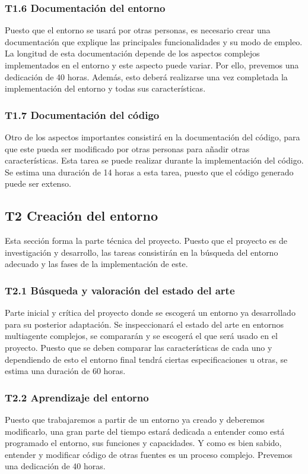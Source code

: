 \subsubsection*{T1.6 Documentación del entorno}
Puesto que el entorno se usará por otras personas, es necesario crear una documentación que explique las principales funcionalidades y su modo de empleo. La longitud de esta documentación depende de los aspectos complejos implementados en el entorno y este aspecto puede variar. Por ello, prevemos una dedicación de 40 horas. Además, esto deberá realizarse una vez completada la implementación del entorno y todas sus características.

\subsubsection*{T1.7 Documentación del código}
Otro de los aspectos importantes consistirá en la documentación del código, para que este pueda ser modificado por otras personas para añadir otras características. Esta tarea se puede realizar durante la implementación del código. Se estima una duración de 14 horas a esta tarea, puesto que el código generado puede ser extenso.

\subsection{T2 Creación del entorno}

Esta sección forma la parte técnica del proyecto. Puesto que el proyecto es de investigación y desarrollo, las tareas consistirán en la búsqueda del entorno adecuado y las fases de la implementación de este.

\subsubsection*{T2.1 Búsqueda y valoración del estado del arte}
Parte inicial y crítica del proyecto donde se escogerá un entorno ya desarrollado para su posterior adaptación. Se inspeccionará el estado del arte en entornos multiagente complejos, se compararán y se escogerá el que será usado en el proyecto. Puesto que se deben comparar las características de cada uno y dependiendo de esto el entorno final tendrá ciertas especificaciones u otras, se estima una duración de 60 horas.

\subsubsection*{T2.2 Aprendizaje del entorno}
Puesto que trabajaremos a partir de un entorno ya creado y deberemos modificarlo, una gran parte del tiempo estará dedicada a entender como está programado el entorno, sus funciones y capacidades. Y como es bien sabido, entender y modificar código de otras fuentes es un proceso complejo. Prevemos una dedicación de 40 horas.

